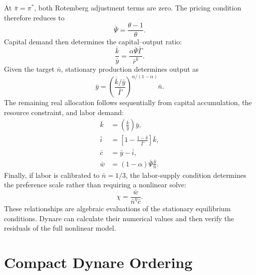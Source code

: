 \documentclass[12pt,final]{article}
\begin{document}
At $\bar\pi=\pi^*$, both Rotemberg adjustment terms are zero.  The pricing
condition therefore reduces to
\begin{equation}
  \bar\Psi=\frac{\theta-1}{\theta}.
  \label{eq:ss-marginal-cost}
\end{equation}
Capital demand then determines the capital--output ratio:
\begin{equation}
  \frac{\bar k}{\bar y}
  =\frac{\alpha\bar\Psi\bar\Gamma}{\bar r^k}.
  \label{eq:ss-capital-output-ratio}
\end{equation}
Given the target $\bar n$, stationary production determines output as
\begin{equation}
  \bar y
  =\left(
  \frac{\bar k/\bar y}{\bar\Gamma}
  \right)^{\alpha/(1-\alpha)}\bar n.
  \label{eq:ss-output}
\end{equation}
The remaining real allocation follows sequentially from capital accumulation,
the resource constraint, and labor demand:
\begin{align}
  \bar k
         & =\left(\frac{\bar k}{\bar y}\right)\bar y,
  \label{eq:ss-capital}                                       \\
  \bar i
         & =\left[1-\frac{1-\delta}{\bar\Gamma}\right]\bar k,
  \label{eq:ss-investment}                                    \\
  \bar c & =\bar y-\bar i,
  \label{eq:ss-consumption}                                   \\
  \bar w & =(1-\alpha)\bar\Psi\frac{\bar y}{\bar n}.
  \label{eq:ss-wage}
\end{align}
Finally, if labor is calibrated to $\bar n=1/3$, the labor-supply condition
determines the preference scale rather than requiring a nonlinear solve:
\begin{equation}
  \chi=\frac{\bar w}{\bar n^{\eta}\bar c}.
  \label{eq:ss-labor-disutility-scale}
\end{equation}
These relationships are algebraic evaluations of the stationary equilibrium
conditions.  Dynare can calculate their numerical values and then verify the
residuals of the full nonlinear model.

\section{Compact Dynare Ordering}
\end{document}
